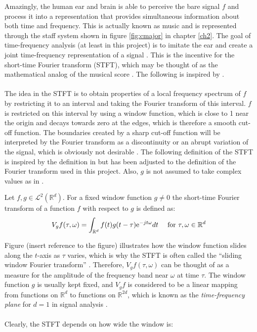 Amazingly, the human ear and brain is able to perceive the bare signal $f$ and process it into a representation that provides simultaneous information about both time and frequency. This is actually known as music and is represented through the staff system shown in figure \ref{fig:cmajor} in chapter \ref{ch2}. The goal of time-frequency analysis (at least in this project) is to imitate the ear and create a joint time-frequency representation of a signal \cite{page 22, FTFA}. This is the incentive for the short-time Fourier transform (STFT), which may be thought of as the mathematical analog of the musical score \cite{page 37, FTFA}. The following is inspired by \cite{page 37, FTFA}.
\\ \\
The idea in the STFT is to obtain properties of a local frequency spectrum of $f$ by restricting it to an interval and taking the Fourier transform of this interval. $f$ is restricted on this interval by using a window function, which is close to 1 near the origin and decays towards zero at the edges, which is therefore a smooth cut-off function. The boundaries created by a sharp cut-off function will be interpreted by the Fourier transform as a discontinuity or an abrupt variation of the signal, which is obviously not desirable \cite{Davis}. The following definition of the STFT is inspired by the definition in \cite{page 37, FTFA} but has been adjusted to the definition of the Fourier transform used in this project. Also, $g$ is not assumed to take complex values as in \cite{page 37, FTFA}.

\begin{definition}
Let $f,g \in \mathcal{L}^2(\mathbb{R}^d)$. For a fixed window function $g \neq 0$ the short-time Fourier transform of a function $f$ with respect to $g$ is defined as:
\begin{align}
V_gf(\tau,\omega) = \int_{\mathbb{R}^d} f(t) g(t - \tau) \text{e}^{-j t \omega} dt \quad \textnormal{ for } \tau,\omega \in \mathbb{R}^d
\end{align}
\end{definition}

Figure (insert reference to the figure) illustrates how the window function slides along the $t$-axis as $\tau$ varies, which is why the STFT is often called the ``sliding window Fourier transform'' . Therefore, $V_gf(\tau,\omega)$ can be thought of as a measure for the amplitude of the frequency band near $\omega$ at time $\tau$. The window function $g$ is usually kept fixed, and $V_gf$ is considered to be a linear mapping from functions on $\mathbb{R}^d$ to functions on $\mathbb{R}^{2d}$, which is known as the \textit{time-frequency plane} for $d=1$ in signal analysis \cite{page 38, FTFA}.
\\ \\
Clearly, the STFT depends on how wide the window is:
